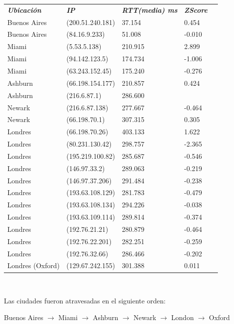 \begin{center}
\begin{tabular}{lllll}
	\textit{\textbf{Ubicaci\'on}}	&	\textit{\textbf{IP}}	&	\textit{\textbf{RTT(media) ms}}	&	\textit{\textbf{ZScore}}	\\
	Buenos Aires		&	(200.51.240.181)		&	37.154		&	0.454	\\
	Buenos Aires		&	(84.16.9.233)		&	51.008		&	-0.010	\\
	\intercontinental
	Miami		&	(5.53.5.138)		&	210.915		&	2.899	\\
	Miami		&	(94.142.123.5)		&	174.734		&	-1.006	\\
	Miami		&	(63.243.152.45)		&	175.240		&	-0.276	\\
	Ashburn		&	(66.198.154.177)		&	210.857		&	0.424	\\
	Ashburn		&	(216.6.87.1)		&	286.600		&	\highestcontinental 1.223	\\
	Newark		&	(216.6.87.138)		&	277.667		&	-0.464	\\
	Newark		&	(66.198.70.1)		&	307.315		&	0.305	\\
	\intercontinental
	Londres		&	(66.198.70.26)		&	403.133		&	1.622	\\
	Londres		&	(80.231.130.42)		&	298.757		&	-2.365	\\
	Londres		&	(195.219.100.82)		&	285.687		&	-0.546	\\
	Londres		&	(146.97.33.2)		&	289.063		&	-0.219	\\
	Londres		&	(146.97.37.206)		&	291.484		&	-0.238	\\
	Londres		&	(193.63.108.129)		&	281.783		&	-0.479	\\
	Londres		&	(193.63.108.134)		&	294.226		&	-0.038	\\
	Londres		&	(193.63.109.114)		&	289.814		&	-0.374	\\
	Londres		&	(192.76.21.21)		&	280.879		&	-0.464	\\
	Londres		&	(192.76.22.201)		&	282.251		&	-0.259	\\
	Londres		&	(192.76.32.66)		&	286.466		&	-0.202	\\
	Londres (Oxford)		&	(129.67.242.155)		&	301.388		&	0.011	\\
\end{tabular}
\end{center}

~

Las ciudades fueron atravesadas en el siguiente orden:

Buenos Aires $\rightarrow$ Miami $\rightarrow$ Ashburn $\rightarrow$ Newark $\rightarrow$ London $\rightarrow$ Oxford

